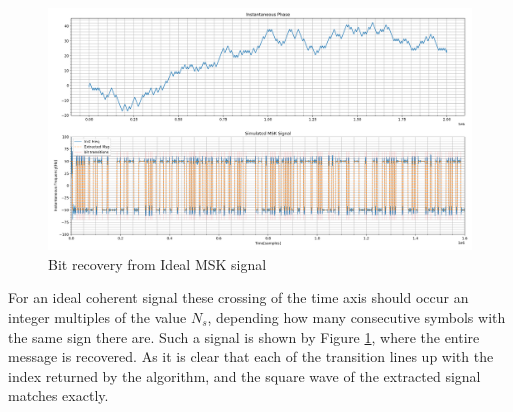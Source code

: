 \begin{figure}[h!]
    \centering
    \includegraphics[width = \textwidth]{figs/sim/symRecovery/ideal_demod.png}
    \caption{Bit recovery from Ideal MSK signal}
    \label{fig:idealBits}
\end{figure}

For an ideal coherent signal these crossing of the time axis should occur an integer multiples of the value $N_s$, depending how many consecutive symbols with the same sign there are. Such a signal is shown by Figure \ref{fig:idealBits}, where the entire message is recovered. As it is clear that each of the transition lines up with the index returned by the algorithm, and the square wave of the extracted signal matches exactly.

